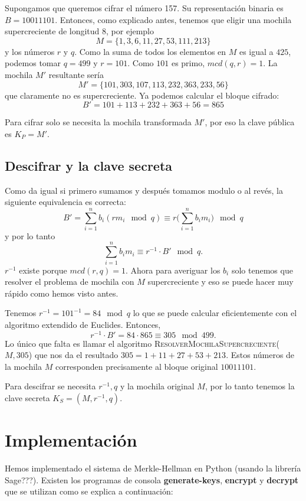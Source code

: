 \documentclass[12pt]{article}
\newenvironment{example}[1][Ejemplo]{\begin{trivlist}
\item[\hskip \labelsep {\bfseries #1}]}{\end{trivlist}}
\begin{document}
\begin{example}
Supongamos que queremos cifrar el número 157. Su representación binaria es $B = 10011101$. Entonces, como explicado antes, tenemos que eligir una mochila supercreciente de longitud $8$, por ejemplo
$$M = \{1, 3, 6, 11, 27, 53, 111, 213\}$$
y los números $r$ y $q$. Como la suma de todos los elementos en $M$ es igual a $425$, podemos tomar $q = 499$ y $r = 101$. Como $101$ es primo, $mcd(q,r) = 1$. La mochila $M'$ resultante sería
$$M' = \{101, 303, 107, 113, 232, 363, 233, 56\}$$
que claramente no es supercreciente. Ya podemos calcular el bloque cifrado:
$$B' = 101 + 113 + 232 + 363 + 56 = 865$$
\end{example}
Para cifrar solo se necesita la mochila transformada $M'$, por eso la clave pública es $K_P = M'$.

\subsection*{Descifrar y la clave secreta}
Como da igual si primero sumamos y después tomamos modulo o al revés, la siguiente equivalencia es correcta:
$$B' = \sum_{i=1}^nb_i(rm_i \mod q) \equiv r\big(\sum_{i=1}^nb_im_i\big)\mod q$$
y por lo tanto
$$\sum_{i=1}^nb_im_i \equiv r^{-1} \cdot B' \mod q.$$
$r^{-1}$ existe porque $mcd(r,q) = 1$. Ahora para averiguar los $b_i$ solo tenemos que resolver el problema de mochila con $M$ supercreciente y eso se puede hacer muy rápido como hemos visto antes.

\begin{example}
Tenemos $r^{-1} = 101^{-1}= 84 \mod q$ lo que se puede calcular eficientemente con el algoritmo extendido de Euclides. Entonces,
$$r^{-1} \cdot B' = 84 \cdot 865 \equiv 305 \mod 499.$$
Lo único que falta es llamar el algoritmo \textsc{ResolverMochilaSupercreciente}($M, 305$) que nos da el resultado $305 = 1 + 11 + 27 + 53 + 213$. Estos números de la mochila $M$ corresponden precisamente al bloque original $10011101$.
\end{example}
Para descifrar se necesita $r^{-1}, q$ y la mochila original $M$, por lo tanto tenemos la clave secreta $K_S = (M, r^{-1}, q)$.

\section{Implementación}

Hemos implementado el sistema de Merkle-Hellman en Python (usando la librería Sage???). Existen los programas de consola \textbf{generate-keys}, \textbf{encrypt} y \textbf{decrypt} que se utilizan como se explica a continuación:
\end{document}
